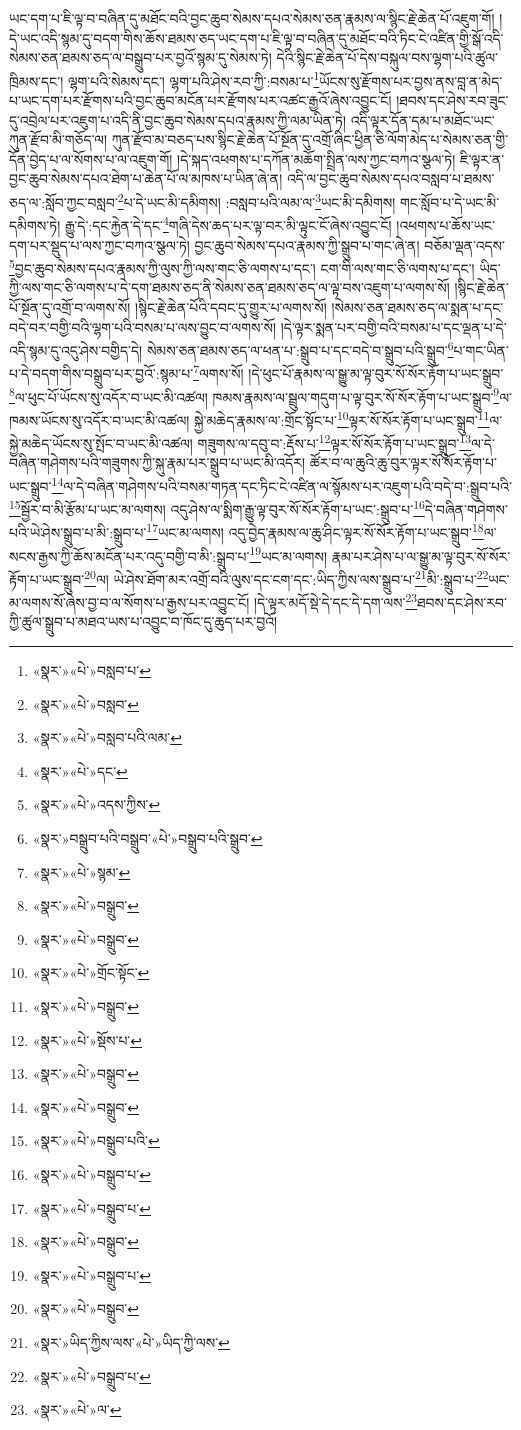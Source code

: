 ཡང་དག་པ་ཇི་ལྟ་བ་བཞིན་དུ་མཐོང་བའི་བྱང་ཆུབ་སེམས་དཔའ་སེམས་ཅན་རྣམས་ལ་སྙིང་རྗེ་ཆེན་པོ་འཇུག་གོ། །དེ་ཡང་འདི་སྙམ་དུ་བདག་གིས་ཆོས་ཐམས་ཅད་ཡང་དག་པ་ཇི་ལྟ་བ་བཞིན་དུ་མཐོང་བའི་ཏིང་ངེ་འཛིན་གྱི་སྒོ་འདི་སེམས་ཅན་ཐམས་ཅད་ལ་བསྒྲུབ་པར་བྱའོ་སྙམ་དུ་སེམས་ཏེ། དེའི་སྙིང་རྗེ་ཆེན་པོ་དེས་བསྐུལ་བས་ལྷག་པའི་ཚུལ་ཁྲིམས་དང་། ལྷག་པའི་སེམས་དང་། ལྷག་པའི་ཤེས་རབ་ཀྱི་:བསམ་པ་\footnote{«སྣར་»«པེ་»བསླབ་པ་}ཡོངས་སུ་རྫོགས་པར་བྱས་ནས་བླ་ན་མེད་པ་ཡང་དག་པར་རྫོགས་པའི་བྱང་ཆུབ་མངོན་པར་རྫོགས་པར་འཚང་རྒྱའོ་ཞེས་འབྱུང་ངོ། །ཐབས་དང་ཤེས་རབ་ཟུང་དུ་འབྲེལ་པར་འཇུག་པ་འདི་ནི་བྱང་ཆུབ་སེམས་དཔའ་རྣམས་ཀྱི་ལམ་ཡིན་ཏེ། འདི་ལྟར་དོན་དམ་པ་མཐོང་ཡང་ཀུན་རྫོབ་མི་གཅོད་ལ། ཀུན་རྫོབ་མ་བཅད་པས་སྙིང་རྗེ་ཆེན་པོ་སྔོན་དུ་འགྲོ་ཞིང་ཕྱིན་ཅི་ལོག་མེད་པ་སེམས་ཅན་གྱི་དོན་བྱེད་པ་ལ་སོགས་པ་ལ་འཇུག་གོ། །དེ་སྐད་འཕགས་པ་དཀོན་མཆོག་སྤྲིན་ལས་ཀྱང་བཀའ་སྩལ་ཏེ། ཇི་ལྟར་ན་བྱང་ཆུབ་སེམས་དཔའ་ཐེག་པ་ཆེན་པོ་ལ་མཁས་པ་ཡིན་ཞེ་ན། འདི་ལ་བྱང་ཆུབ་སེམས་དཔའ་བསླབ་པ་ཐམས་ཅད་ལ་:སློབ་ཀྱང་བསླབ་\footnote{«སྣར་»«པེ་»བསླབ་}པ་དེ་ཡང་མི་དམིགས། :བསླབ་པའི་ལམ་ལ་\footnote{«སྣར་»«པེ་»བསླབ་པའི་ལམ་}ཡང་མི་དམིགས། གང་སློབ་པ་དེ་ཡང་མི་དམིགས་ཏེ། རྒྱུ་དེ་:དང་རྐྱེན་དེ་དང་\footnote{«སྣར་»«པེ་»དང་}གཞི་དེས་ཆད་པར་ལྟ་བར་མི་ལྟུང་ངོ་ཞེས་འབྱུང་ངོ། །འཕགས་པ་ཆོས་ཡང་དག་པར་སྡུད་པ་ལས་ཀྱང་བཀའ་སྩལ་ཏེ། བྱང་ཆུབ་སེམས་དཔའ་རྣམས་ཀྱི་སྒྲུབ་པ་གང་ཞེ་ན། བཅོམ་ལྡན་འདས་\footnote{«སྣར་»«པེ་»འདས་ཀྱིས་}བྱང་ཆུབ་སེམས་དཔའ་རྣམས་ཀྱི་ལུས་ཀྱི་ལས་གང་ཅི་ལགས་པ་དང་། ངག་གི་ལས་གང་ཅི་ལགས་པ་དང་། ཡིད་ཀྱི་ལས་གང་ཅི་ལགས་པ་དེ་དག་ཐམས་ཅད་ནི་སེམས་ཅན་ཐམས་ཅད་ལ་ལྟ་བས་འཇུག་པ་ལགས་སོ། །སྙིང་རྗེ་ཆེན་པོ་སྔོན་དུ་འགྲོ་བ་ལགས་སོ། །སྙིང་རྗེ་ཆེན་པོའི་དབང་དུ་གྱུར་པ་ལགས་སོ། །སེམས་ཅན་ཐམས་ཅད་ལ་སྨན་པ་དང་བདེ་བར་བགྱི་བའི་ལྷག་པའི་བསམ་པ་ལས་བྱུང་བ་ལགས་སོ། །དེ་ལྟར་སྨན་པར་བགྱི་བའི་བསམ་པ་དང་ལྡན་པ་དེ་འདི་སྙམ་དུ་འདུ་ཤེས་བགྱིད་དེ། སེམས་ཅན་ཐམས་ཅད་ལ་ཕན་པ་:སྒྲུབ་པ་དང་བདེ་བ་སྒྲུབ་པའི་སྒྲུབ་\footnote{«སྣར་»བསྒྲུབ་པའི་བསྒྲུབ་«པེ་»བསྒྲུབ་པའི་སྒྲུབ་}པ་གང་ཡིན་པ་དེ་བདག་གིས་བསྒྲུབ་པར་བྱའོ་:སྙམ་པ་\footnote{«སྣར་»«པེ་»སྙམ་}ལགས་སོ། །དེ་ཕུང་པོ་རྣམས་ལ་སྒྱུ་མ་ལྟ་བུར་སོ་སོར་རྟོག་པ་ཡང་སྒྲུབ་\footnote{«སྣར་»«པེ་»བསྒྲུབ་}ལ་ཕུང་པོ་ཡོངས་སུ་འདོར་བ་ཡང་མི་འཚལ། ཁམས་རྣམས་ལ་སྦྲུལ་གདུག་པ་ལྟ་བུར་སོ་སོར་རྟོག་པ་ཡང་སྒྲུབ་\footnote{«སྣར་»«པེ་»བསྒྲུབ་}ལ་ཁམས་ཡོངས་སུ་འདོར་བ་ཡང་མི་འཚལ། སྐྱེ་མཆེད་རྣམས་ལ་:གྲོང་སྟོང་པ་\footnote{«སྣར་»«པེ་»གྲོང་སྟོང་}ལྟར་སོ་སོར་རྟོག་པ་ཡང་སྒྲུབ་\footnote{«སྣར་»«པེ་»བསྒྲུབ་}ལ་སྐྱེ་མཆེད་ཡོངས་སུ་སྤོང་བ་ཡང་མི་འཚལ། གཟུགས་ལ་དབུ་བ་:རྡོས་པ་\footnote{«སྣར་»«པེ་»སྡོས་པ་}ལྟར་སོ་སོར་རྟོག་པ་ཡང་སྒྲུབ་\footnote{«སྣར་»«པེ་»བསྒྲུབ་}ལ་དེ་བཞིན་གཤེགས་པའི་གཟུགས་ཀྱི་སྐུ་རྣམ་པར་སྒྲུབ་པ་ཡང་མི་འདོར། ཚོར་བ་ལ་ཆུའི་ཆུ་བུར་ལྟར་སོ་སོར་རྟོག་པ་ཡང་སྒྲུབ་\footnote{«སྣར་»«པེ་»བསྒྲུབ་}ལ་དེ་བཞིན་གཤེགས་པའི་བསམ་གཏན་དང་ཏིང་ངེ་འཛིན་ལ་སྙོམས་པར་འཇུག་པའི་བདེ་བ་:སྒྲུབ་པའི་\footnote{«སྣར་»«པེ་»བསྒྲུབ་པའི་}སྦྱོར་བ་མི་རྩོམ་པ་ཡང་མ་ལགས། འདུ་ཤེས་ལ་སྨིག་རྒྱུ་ལྟ་བུར་སོ་སོར་རྟོག་པ་ཡང་:སྒྲུབ་པ་\footnote{«སྣར་»«པེ་»བསྒྲུབ་པ་}དེ་བཞིན་གཤེགས་པའི་ཡེ་ཤེས་སྒྲུབ་པ་མི་:སྒྲུབ་པ་\footnote{«སྣར་»«པེ་»བསྒྲུབ་པ་}ཡང་མ་ལགས། འདུ་བྱེད་རྣམས་ལ་ཆུ་ཤིང་ལྟར་སོ་སོར་རྟོག་པ་ཡང་སྒྲུབ་\footnote{«སྣར་»«པེ་»བསྒྲུབ་}ལ་སངས་རྒྱས་ཀྱི་ཆོས་མངོན་པར་འདུ་བགྱི་བ་མི་:སྒྲུབ་པ་\footnote{«སྣར་»«པེ་»བསྒྲུབ་པ་}ཡང་མ་ལགས། རྣམ་པར་ཤེས་པ་ལ་སྒྱུ་མ་ལྟ་བུར་སོ་སོར་རྟོག་པ་ཡང་སྒྲུབ་\footnote{«སྣར་»«པེ་»བསྒྲུབ་}ལ། ཡེ་ཤེས་ཐོག་མར་འགྲོ་བའི་ལུས་དང་ངག་དང་:ཡིད་ཀྱིས་ལས་སྒྲུབ་པ་\footnote{«སྣར་»ཡིད་ཀྱིས་ལས་«པེ་»ཡིད་ཀྱི་ལས་}མི་:སྒྲུབ་པ་\footnote{«སྣར་»«པེ་»བསྒྲུབ་པ་}ཡང་མ་ལགས་སོ་ཞེས་བྱ་བ་ལ་སོགས་པ་རྒྱས་པར་འབྱུང་ངོ། །དེ་ལྟར་མདོ་སྡེ་དེ་དང་དེ་དག་ལས་\footnote{«སྣར་»«པེ་»ལ་}ཐབས་དང་ཤེས་རབ་ཀྱི་ཚུལ་སྒྲུབ་པ་མཐའ་ཡས་པ་འབྱུང་བ་ཁོང་དུ་ཆུད་པར་བྱའོ། 